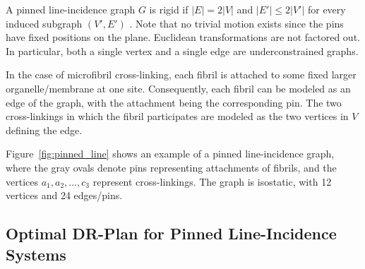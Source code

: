 %
%
A pinned line-incidence graph $G$ is rigid if $|E| = 2|V|$ and $|E'| \le 2|V'|$ for every induced subgraph $(V',E')$ \cite{sitharam2014incidence}. Note that no trivial motion exists since the pins have fixed positions on the plane. Euclidean transformations are not factored out. In particular, both a single vertex and a single edge are underconstrained graphs.




In the case of microfibril cross-linking, each fibril is attached to some fixed larger organelle/membrane at one site. Consequently, each fibril can be modeled as an edge of the graph, with the attachment being the corresponding pin. The two cross-linkings in which the fibril participates are modeled as the two vertices in $V$ defining the edge.



Figure~\ref{fig:pinned_line} shows an example of a pinned line-incidence graph, where the gray ovals denote pins representing attachments of fibrils, and the vertices $a_1,a_2,\ldots, c_3$ represent cross-linkings.
The graph is isostatic, with 12 vertices and 24 edges/pins.



\subsection{Optimal DR-Plan for Pinned Line-Incidence Systems}


